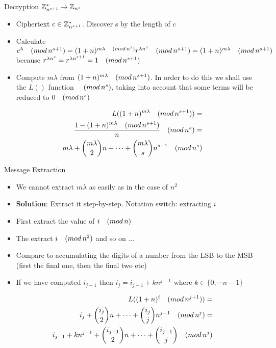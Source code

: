 \documentclass{beamer}
\begin{document}
\begin{frame}[allowframebreaks]{Decryption $\mathbb{Z}_{n^{s+1}}^* \rightarrow \mathbb{Z}_{n^s}$}
\begin{itemize}
\item Ciphertext $c \in \mathbb{Z}_{n^{s+1}}^*$. Discover s by the length of $c$
\item Calculate $c^\lambda \quad (mod \, {n^{s+1}}) = (1+n)^{m  \lambda \quad (mod \, {n^{s}})}  r^{\lambda  n^s} \quad (mod \, {n^{s+1}}) = (1+n)^{m  \lambda} \quad (mod \, {n^{s+1}}) $ because $ r^{\lambda  n^s} = r^{\lambda{n^{s+1}}} = 1 \quad (mod \, {n^{s+1}}) $
\item  Compute $m  \lambda$ from $ (1+n)^{m  \lambda} \quad (mod \, {n^{s+1}}) $. In order to do this we shall use the $L()$ function $ \quad (mod \, {n^s})$, taking into account that some terms will be reduced to $0 \quad (mod \, {n^s})$
\end{itemize}

\begin{align*}
L((1+n)^{m  \lambda} \quad (mod \, {n^{s+1}})) = \\
\frac{1-(1+n)^{m  \lambda} \quad (mod \, {n^{s+1}})}{n} \quad (mod \, {n^s}) = \\
m  \lambda + {m  \lambda \choose 2}n + \cdots + {m  \lambda \choose s}n^{s-1} \quad (mod \, {n^s})
\end{align*}
 
\begin{block}{Message Extraction}
\begin{itemize}
\item We cannot extract $m  \lambda$ as easily as in the case of $n^2$
\item \textbf{Solution}: Extract it step-by-step. Notation switch: extracting $i$
\item First extract the value of $i \quad (mod \, {n})$
\item The extract $i \quad (mod \, {n^2})$ and so on ...
\item Compare to accumulating the digits of a number from the LSB to the MSB (first the final one, then the final two etc)
\item If we have computed $i_{j-1}$ then $i_j = i_{j-1} + kn^{j-1}$ where $k \in \{0, \cdots n-1\}$
\end{itemize}
\end{block}

\begin{align*}
L((1+n)^{i} \quad (mod \, {n^{j+1}}))= \\
i_j + {i_j \choose 2}n + \cdots + {i_j  \choose j} n^{j-1} \quad (mod \, {n^j}) = \\
i_{j-1} + kn^{j-1} + { i_{j-1} \choose 2}n + \cdots + { i_{j-1} \choose {j}} \quad (mod \, {n^j}) 
\end{align*} 


\end{frame}
\end{document}
